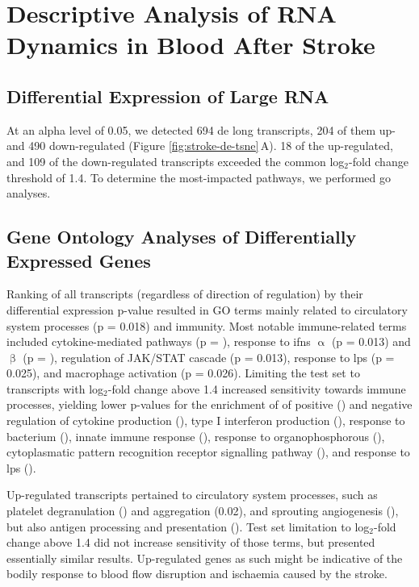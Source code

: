 \section{Descriptive Analysis of RNA Dynamics in Blood After Stroke}

\subsection{Differential Expression of Large RNA}
At an alpha level of 0.05, we detected 694 \acf{de} long transcripts, 204 of them up- and 490 down-regulated (Figure \ref{fig:stroke-de-tsne}\,A). 18 of the up-regulated, and 109 of the down-regulated transcripts exceeded the common log$_2$-fold change threshold of 1.4. To determine the most-impacted pathways, we performed \ac{go} analyses.

\subsection{Gene Ontology Analyses of Differentially Expressed Genes} \label{sec:stroke:large-rna-go}
Ranking of all transcripts (regardless of direction of regulation) by their differential expression p-value resulted in GO terms mainly related to circulatory system processes (p = 0.018) and immunity. Most notable immune-related terms included cytokine-mediated pathways (p = ), response to \acp{ifn} $\upalpha$ (p = 0.013) and $\upbeta$ (p = ), regulation of JAK/STAT cascade (p = 0.013), response to \ac{lps} (p = 0.025), and macrophage activation (p = 0.026). Limiting the test set to transcripts with log$_2$-fold change above 1.4\,\,increased sensitivity towards immune processes, yielding lower p-values for the enrichment of of positive () and negative regulation of cytokine production (), type I interferon production (), response to bacterium (), innate immune response (), response to organophosphorous (), cytoplasmatic pattern recognition receptor signalling pathway (), and response to \ac{lps} ().

Up-regulated transcripts pertained to circulatory system processes, such as platelet degranulation () and aggregation (0.02), and sprouting angiogenesis (), but also antigen processing and presentation (). Test set limitation to log$_2$-fold change above 1.4 did not increase sensitivity of those terms, but presented essentially similar results. Up-regulated genes as such might be indicative of the bodily response to blood flow disruption and ischaemia caused by the stroke. 

